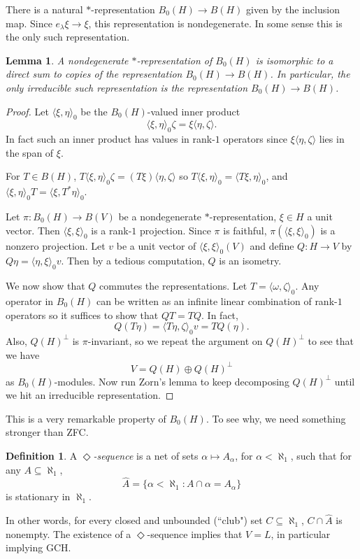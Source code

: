 \documentclass[12pt]{report}
\newcommand{\dfn}[1]{\emph{#1}\index{#1}}
\newtheorem{lemma}[theorem]{Lemma}
\theoremstyle{definition}
\newtheorem{definition}[theorem]{Definition}
\begin{document}
There is a natural $*$-representation $B_0(H) \to B(H)$ given by the inclusion map. Since $e_\lambda\xi \to \xi$, this representation is nondegenerate. In some sense this is the only such representation.
\begin{lemma}
    A nondegenerate $*$-representation of $B_0(H)$ is isomorphic to a direct sum to copies of the representation $B_0(H) \to B(H)$. In particular, the only irreducible such representation is the representation $B_0(H) \to B(H)$. 
\end{lemma}
\begin{proof}
    Let $\langle \xi, \eta\rangle_0$ be the $B_0(H)$-valued inner product
    $$\langle \xi, \eta\rangle_0 \zeta = \xi \langle \eta, \zeta\rangle.$$
    In fact such an inner product has values in rank-$1$ operators since $\xi \langle \eta, \zeta\rangle$ lies in the span of $\xi$.

    For $T \in B(H)$, $T\langle \xi, \eta\rangle_0\zeta = (T\xi)\langle \eta, \zeta\rangle$ so $T\langle \xi, \eta\rangle_0 = \langle T\xi, \eta\rangle_0$, and $\langle \xi, \eta\rangle_0T = \langle \xi, T^*\eta\rangle_0$.

    Let $\pi: B_0(H) \to B(V)$ be a nondegenerate $*$-representation, $\xi \in H$ a unit vector. Then $\langle \xi, \xi\rangle_0$ is a rank-$1$ projection. Since $\pi$ is faithful, $\pi(\langle \xi, \xi\rangle_0)$ is a nonzero projection. Let $v$ be a unit vector of $\langle \xi, \xi\rangle_0(V)$ and define $Q: H \to V$ by $Q\eta = \langle \eta, \xi\rangle_0 v$. Then by a tedious computation, $Q$ is an isometry.

    We now show that $Q$ commutes the representations. Let $T = \langle \omega, \zeta\rangle_0$. Any operator in $B_0(H)$ can be written as an infinite linear combination of rank-$1$ operators so it suffices to show that $QT = TQ$. In fact,
    $$Q(T\eta) = \langle T\eta, \zeta\rangle_0 v = TQ(\eta).$$
    Also, $Q(H)^\perp$ is $\pi$-invariant, so we repeat the argument on $Q(H)^\perp$ to see that we have
    $$V = Q(H) \oplus Q(H)^\perp$$
    as $B_0(H)$-modules. Now run Zorn's lemma to keep decomposing $Q(H)^\perp$ until we hit an irreducible representation.
\end{proof}

This is a very remarkable property of $B_0(H)$. To see why, we need something stronger than ZFC.
\begin{definition}
    A \dfn{$\Diamond$-sequence} is a net of sets $\alpha \mapsto A_\alpha$, for $\alpha < \aleph_1$, such that for any $A \subseteq \aleph_1$,
    $$\hat A = \{\alpha < \aleph_1: A \cap \alpha = A_\alpha\}$$
    is stationary in $\aleph_1$.
\end{definition}
In other words, for every closed and unbounded (``club") set $C \subseteq \aleph_1$, $C \cap \hat A$ is nonempty. The existence of a $\Diamond$-sequence implies that $V = L$, in particular implying GCH.
\end{document}
